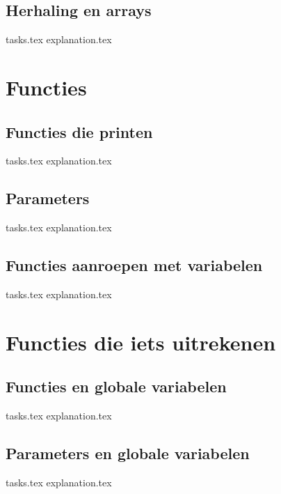 \documentclass[b5paper,openright,twoside]{report}
\begin{document}
    \section{Herhaling en arrays}
    {tasks.tex}        \newpage
    {explanation.tex}  \newpage

    \chapter{Functies}
    \newpage

    \section{Functies die printen}
    {tasks.tex}         \newpage
    {explanation.tex}   \newpage

    \section{Parameters}
    {tasks.tex}        \newpage
    {explanation.tex}  \newpage

    \section{Functies aanroepen met variabelen}
    {tasks.tex}          \newpage
    {explanation.tex}    \newpage

    \chapter{Functies die iets uitrekenen}
    \newpage

    \section{Functies en globale variabelen}
    {tasks.tex}            \newpage
    {explanation.tex}      \newpage

    \section{Parameters en globale variabelen}
    {tasks.tex}       \newpage
    {explanation.tex} \newpage
\end{document}
